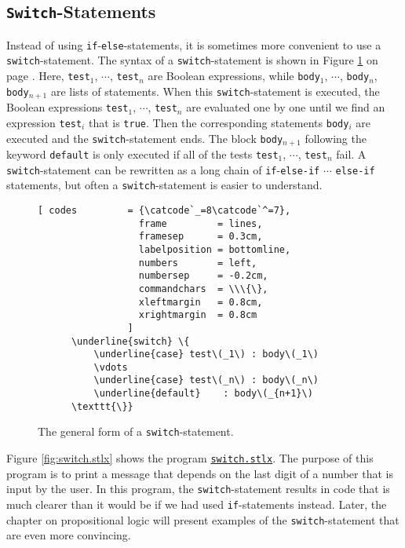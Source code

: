 \subsection{\texttt{Switch}-Statements}
Instead of using \texttt{if}-\texttt{else}-statements, it is sometimes more convenient to use a
\texttt{switch}-statement. The syntax of a \texttt{switch}-statement is shown in Figure
\ref{fig:case} on page \pageref{fig:case}.  Here, 
\texttt{test}$_1$, $\cdots$, \texttt{test}$_n$ are Boolean expressions, while
\texttt{body}$_1$, $\cdots$, \texttt{body}$_n$, \texttt{body}$_{n+1}$ are lists of statements.
When this \texttt{switch}-statement is executed, the Boolean expressions
\texttt{test}$_1$, $\cdots$, \texttt{test}$_n$ are evaluated one by one until we find an expression 
\texttt{test}$_i$ that is \texttt{true}.  Then the corresponding statements \texttt{body}$_i$ are executed and
the \texttt{switch}-statement ends.   The block \texttt{body}$_{n+1}$ following the keyword \texttt{default} is
only executed if all of the tests \texttt{test}$_1$, $\cdots$, \texttt{test}$_n$ fail.
A \texttt{switch}-statement can be rewritten as a long chain of \texttt{if}-\texttt{else-if} $\cdots$
\texttt{else-if} statements, but often a \texttt{switch}-statement is easier to understand.


\begin{figure}[!ht]
  \centering
\begin{Verbatim}[ codes         = {\catcode`_=8\catcode`^=7},
                  frame         = lines, 
                  framesep      = 0.3cm, 
                  labelposition = bottomline,
                  numbers       = left,
                  numbersep     = -0.2cm,
                  commandchars  = \\\{\},
                  xleftmargin   = 0.8cm,
                  xrightmargin  = 0.8cm
                ]
      \underline{switch} \{
          \underline{case} test\(_1\) : body\(_1\) 
          \vdots
          \underline{case} test\(_n\) : body\(_n\)
          \underline{default}    : body\(_{n+1}\)
      \texttt{\}}
\end{Verbatim}
\vspace*{-0.3cm}
\caption{The general form of a \texttt{switch}-statement.}  \label{fig:case}
\end{figure} 

Figure \ref{fig:switch.stlx} shows the program 
\href{https://github.com/karlstroetmann/Logik/blob/master/SetlX/switch.stlx}{\texttt{switch.stlx}}.
The purpose of this program is to print a message that depends on the last digit of a number that is input by
the user.  In this program, the \texttt{switch}-statement  results in code that is much clearer than
it would be if we had
used \texttt{if}-statements instead.  Later, the chapter on propositional logic will present examples of the
\texttt{switch}-statement that are even more convincing.


